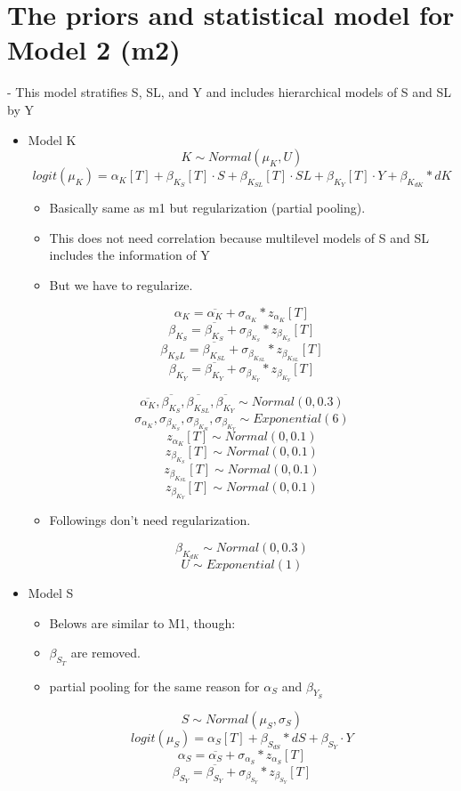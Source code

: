 \documentclass{article}
\begin{document}
\section{The priors and statistical model for Model 2 (m2)}
- This model stratifies S, SL, and Y and includes hierarchical models of S and SL by Y
\begin{itemize}
\item Model K
$$K \sim Normal(\mu_K, U) $$
$$logit(\mu_K) = \alpha _{K}[T] + \beta _{K_S}[T] \cdot S + \beta _{K_{SL}}[T] \cdot SL + \beta _{K_{Y}}[T] \cdot Y + \beta _{K_{dK}} * dK$$

\begin{itemize}
    \item Basically same as m1 but regularization (partial pooling). 
    \item This does not need correlation because multilevel models of S and SL includes the information of Y 
    \item But we have to regularize.
\end{itemize}
$$\alpha _K = \overline{\alpha _K} + \sigma_{\alpha _K} * z_{\alpha _K}[T] $$
$$\beta _{K_S } = \overline{\beta _{K _S}} + \sigma_{\beta _{K _S}} * z_{\beta _{K_S}}[T] $$
$$\beta _{K_SL } = \overline{\beta _{K _{SL}}} + \sigma_{\beta _{K _{SL}}} * z_{\beta _{K_{SL}}}[T] $$
$$\beta _{K_Y } = \overline{\beta _{K _Y}} + \sigma_{\beta _{K _Y}} * z_{\beta _{K_Y}}[T] $$

$$\overline{\alpha _K}, \overline{\beta _{K _S}}, \overline{\beta _{K _{SL}}}, \overline{\beta _{K _Y}} \sim Normal(0,0.3)$$
$$\sigma_{\alpha _K}, \sigma_{\beta _{K _S}}, \sigma_{\beta _{K _{Sl}}}, \sigma_{\beta _{K _Y}} \sim Exponential(6)$$
$$z_{\alpha _K}[T] \sim Normal(0,0.1)$$
$$z_{\beta _{K_S}}[T]  \sim Normal(0,0.1)$$
$$z_{\beta _{K_{SL}}}[T]  \sim Normal(0,0.1)$$
$$z_{\beta _{K_Y}}[T]  \sim Normal(0,0.1)$$

\begin{itemize}
    \item Followings don't need regularization.
\end{itemize}
$$\beta _{K_{dK}} \sim Normal(0, 0.3)$$
$$U \sim Exponential(1)$$


\item Model S 
\begin{itemize}
    \item Belows are similar to M1, though:
    \item $\beta _{S_T}$ are removed. 
    \item partial pooling for the same reason for $\alpha_S$ and $\beta _{Y_S}$
\end{itemize}
$$S \sim Normal(\mu_S, \sigma_S)$$
$$logit(\mu_S) = \alpha _S [T] + \beta _ {S_{dS}} * dS + \beta _{S_Y} \cdot Y$$
$$\alpha_S = \overline{\alpha _S} + \sigma_{\alpha _S} * z_{\alpha _S}[T]$$
$$\beta _{S_Y} = \overline{\beta _{S_Y}} + \sigma _{\beta _{S_Y}} * z _ {\beta _{S_Y}}[T]$$


\end{itemize}
\end{document}
